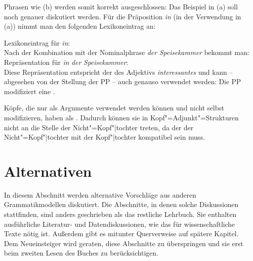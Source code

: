 Phrasen wie (b) werden somit korrekt ausgeschlossen:
\eal
\label{ex-die-Wurst-in}
\zl
Das Beispiel in (a) soll noch genauer diskutiert werden. Für die Präposition \emph{in} (in der
Verwendung in (a)) nimmt man den folgenden Lexikoneintrag an:

\ea
Lexikoneintrag für \emph{in}:\\
\z
Nach der Kombination mit der Nominalphrase \emph{der Speisekammer} bekommt man:
\ea
Repräsentation für \emph{in der Speisekammer}:\\
\z
Diese Repräsentation entspricht der des Adjektivs \emph{interessantes} und kann 
-- abgesehen von der Stellung der PP -- auch genauso verwendet
werden: Die PP modifiziert eine \nbar.

Köpfe, die nur als Argumente verwendet werden können und nicht selbst modifizieren,
haben als \modw {}. Dadurch können sie in Kopf"=Adjunkt"=Strukturen nicht an die Stelle
der Nicht"=Kopf"|tochter treten, da der \modw der Nicht"=Kopf"|tochter mit der Kopf"|tochter kompatibel
sein muss.



\section{Alternativen}

In diesem Abschnitt werden alternative Vorschläge aus anderen Grammatikmodellen diskutiert.
Die Abschnitte, in denen solche Diskussionen stattfinden, sind anders geschrieben als das restliche
Lehrbuch. Sie enthalten ausführliche Literatur- und Datendiskussionen, wie das für wissenschaftliche
Texte nötig ist. Außerdem gibt es mitunter Querverweise auf spätere Kapitel. Dem Neueinsteiger
wird geraten, diese Abschnitte zu überspringen und sie erst beim zweiten Lesen des Buches zu berücksichtigen.

